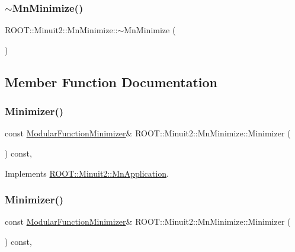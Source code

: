\subsubsection{\texorpdfstring{$\sim$MnMinimize()}{~MnMinimize()}\hspace{0.1cm}{\footnotesize\ttfamily [2/2]}}
{\footnotesize\ttfamily R\+O\+O\+T\+::\+Minuit2\+::\+Mn\+Minimize\+::$\sim$\+Mn\+Minimize (\begin{DoxyParamCaption}{ }\end{DoxyParamCaption})\hspace{0.3cm}{\ttfamily [inline]}}



\subsection{Member Function Documentation}
\mbox{\label{classROOT_1_1Minuit2_1_1MnMinimize_a879bb789f98c72f9a90a327fc7bb48fd}} 
\subsubsection{\texorpdfstring{Minimizer()}{Minimizer()}\hspace{0.1cm}{\footnotesize\ttfamily [1/2]}}
{\footnotesize\ttfamily const \mbox{\hyperlink{classROOT_1_1Minuit2_1_1ModularFunctionMinimizer}{Modular\+Function\+Minimizer}}\& R\+O\+O\+T\+::\+Minuit2\+::\+Mn\+Minimize\+::\+Minimizer (\begin{DoxyParamCaption}{ }\end{DoxyParamCaption}) const\hspace{0.3cm}{\ttfamily [inline]}, {\ttfamily [virtual]}}



Implements \mbox{\hyperlink{classROOT_1_1Minuit2_1_1MnApplication_a5a8e1e2658b731b5f4023dd1b1594223}{R\+O\+O\+T\+::\+Minuit2\+::\+Mn\+Application}}.

\mbox{\label{classROOT_1_1Minuit2_1_1MnMinimize_a879bb789f98c72f9a90a327fc7bb48fd}} 
\subsubsection{\texorpdfstring{Minimizer()}{Minimizer()}\hspace{0.1cm}{\footnotesize\ttfamily [2/2]}}
{\footnotesize\ttfamily const \mbox{\hyperlink{classROOT_1_1Minuit2_1_1ModularFunctionMinimizer}{Modular\+Function\+Minimizer}}\& R\+O\+O\+T\+::\+Minuit2\+::\+Mn\+Minimize\+::\+Minimizer (\begin{DoxyParamCaption}{ }\end{DoxyParamCaption}) const\hspace{0.3cm}{\ttfamily [inline]}, {\ttfamily [virtual]}}



